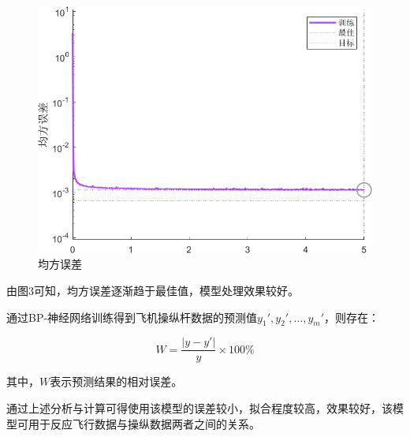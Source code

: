 \documentclass[UTF8]{ctexart}
\begin{document}
	\begin{figure}[h]
	\centering
	\includegraphics[scale=0.8]{均方误差.png}
	\caption{均方误差}
\end{figure}\par
由图3可知，均方误差逐渐趋于最佳值，模型处理效果较好。 \par
通过BP-神经网络训练得到飞机操纵杆数据的预测值$y_1\prime,y_2\prime,…,y_m\prime$，则存在：  \par
\begin{equation}
	W=\frac{\left| y-y\prime \right|}{y}\times 100\%
\end{equation}\par 
其中，$W$表示预测结果的相对误差。  \par
通过上述分析与计算可得使用该模型的误差较小，拟合程度较高，效果较好，该模型可用于反应飞行数据与操纵数据两者之间的关系。  \par
\end{document}
